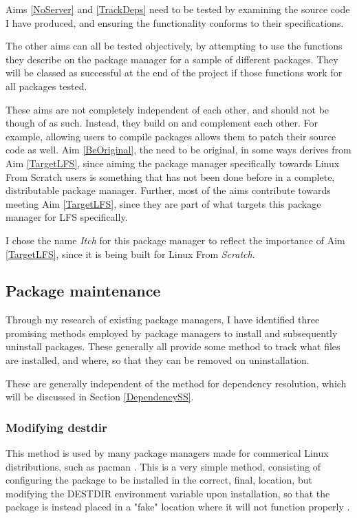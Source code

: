 \documentclass[10pt]{article}
\begin{document}
Aims \ref{NoServer} and \ref{TrackDeps} need to be tested by examining the source code I have produced, and ensuring the functionality conforms to their specifications.

The other aims can all be tested objectively, by attempting to use the functions they describe on the package manager for a sample of different packages. They will be classed as successful at the end of the project if those functions work for all packages tested.

These aims are not completely independent of each other, and should not be though of as such. Instead, they build on and complement each other. For example, allowing users to compile packages allows them to patch their source code as well. Aim \ref{BeOriginal}, the need to be original, in some ways derives from Aim \ref{TargetLFS}, since aiming the package manager specifically towards Linux From Scratch users is something that has not been done before in a complete, distributable package manager. Further, most of the aims contribute towards meeting Aim \ref{TargetLFS}, since they are part of what targets this package manager for LFS specifically.

I chose the name \textit{Itch} for this package manager to reflect the importance of Aim \ref{TargetLFS}, since it is being built for Linux From \textit{Scratch}.

\subsection{Package maintenance}

Through my research of existing package managers, I have identified three promising methods employed by package managers to install and subsequently uninstall packages. These generally all provide some method to track what files are installed, and where, so that they can be removed on uninstallation.

These are generally independent of the method for dependency resolution, which will be discussed in Section \ref{DependencySS}.

\subsubsection{Modifying destdir} \label{DestdirSSS}

This method is used by many package managers made for commerical Linux distributions, such as pacman \cite{ArchWikiPacman}. This is a very simple method, consisting of configuring the package to be installed in the correct, final, location, but modifying the DESTDIR environment variable upon installation, so that the package is instead placed in a "fake" location where it will not function properly \cite{FakerootLFS}.
\end{document}
